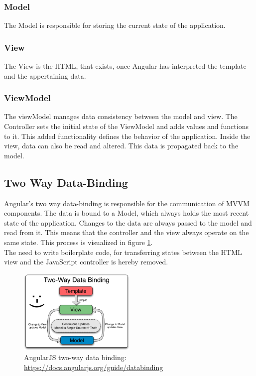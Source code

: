 \subsubsection{Model}
The Model  is responsible for storing the current state of the application.

\subsubsection{View}
The View is the HTML, that exists, once Angular has interpreted the template and the appertaining data.

\subsubsection{ViewModel}
\label{sec:viewModel}
The viewModel manages data consistency between the model and view. The Controller sets the initial state of the ViewModel and adds values and functions to it. This added functionality defines the behavior of the application. Inside the view, data can also be read and altered. This data is propagated back to the model.


\subsection{Two Way Data-Binding}
\label{sec:tw-binding}
Angular's two way data-binding is responsible for the communication of MVVM components. The data is bound to a Model, which always holds the most recent state of the application. Changes to the data are always passed to the model and read from it. This means that the controller and the view always operate on the same state. This process is visualized in figure \ref{fig:tw-databinding}.\\
The need to write boilerplate code, for transferring states between the HTML view and the JavaScript controller is hereby removed.

\begin{figure}[H]
	\centering\includegraphics[width=0.5\textwidth]{res/Two_Way_Data_Binding}
	\caption{AngularJS two-way data binding: \url{https://docs.angularjs.org/guide/databinding}}
	\label{fig:tw-databinding}
\end{figure}


